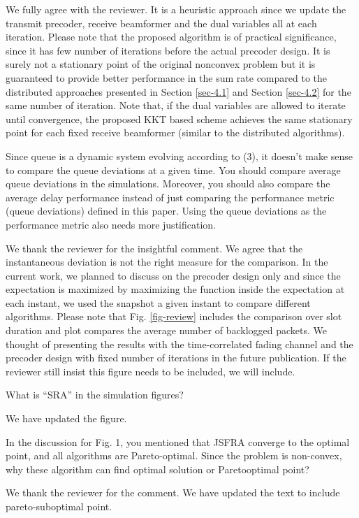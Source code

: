 \resp We fully agree with the reviewer. It is a heuristic approach since we update the transmit precoder, receive beamformer and the dual variables all at each iteration. Please note that the proposed algorithm is of practical significance, since it has few number of iterations before the actual precoder design. It is surely not a stationary point of the original nonconvex problem but it is guaranteed to provide better performance in the sum rate compared to the distributed approaches presented in Section \ref{sec-4.1} and Section \ref{sec-4.2} for the same number of iteration. Note that, if the dual variables are allowed to iterate until convergence, the proposed KKT based scheme achieves the same stationary point for each fixed receive beamformer (similar to the distributed algorithms).

 Since queue is a dynamic system evolving according to (3), it doesn’t make sense to compare the queue deviations at a given time. You should compare average queue deviations in the simulations. Moreover, you should also compare the average delay performance instead of just comparing the performance metric (queue deviations) defined in this paper. Using the queue deviations as the performance metric also needs more justification.

\resp We thank the reviewer for the insightful comment. We agree that the instantaneous deviation is not the right measure for the comparison. In the current work, we planned to discuss on the precoder design only and since the expectation is maximized by maximizing the function inside the expectation at each instant, we used the snapshot a given instant to compare different algorithms. Please note that Fig. \ref{fig-review} includes the comparison over  slot duration and plot compares the average number of backlogged packets. We thought of presenting the results with the time-correlated fading channel and the precoder design with fixed number of iterations in the future publication. If the reviewer still insist this figure needs to be included, we will include.

 What is “SRA” in the simulation figures?

\resp We have updated the figure.

 In the discussion for Fig. 1, you mentioned that JSFRA converge to the optimal point, and all algorithms are Pareto-optimal. Since the problem is non-convex, why these algorithm can find optimal solution or Paretooptimal point? 

\resp We thank the reviewer for the comment. We have updated the text to include pareto-suboptimal point.


